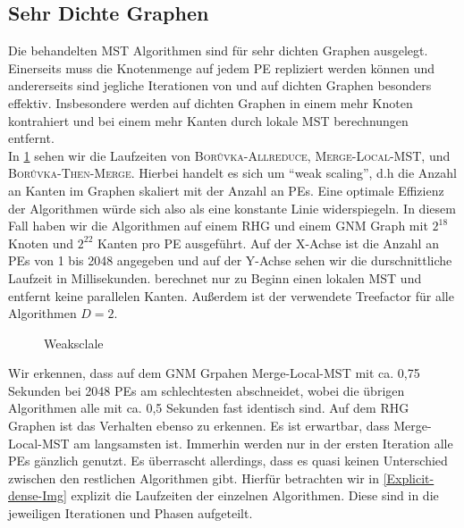 \subsection{Sehr Dichte Graphen}\label{dense}
Die behandelten MST Algorithmen sind für sehr dichten Graphen ausgelegt. Einerseits muss die Knotenmenge auf jedem PE repliziert werden können und andererseits sind jegliche Iterationen von \boruvkaAllreduce und \mergeMST auf dichten Graphen besonders effektiv. Insbesondere werden auf dichten Graphen in einem \boruvkaStep mehr Knoten kontrahiert und bei einem \mergeStep mehr Kanten durch lokale MST berechnungen entfernt.\\
In \cref{WeakSkale-dense-Img} sehen wir die Laufzeiten von \textsc{Bor{\r u}vka-Allreduce}, \textsc{Merge-Local-MST}, \boruvkaMixedMerge und \textsc{Bor{\r u}vka-Then-Merge}. Hierbei handelt es sich um \enquote{weak scaling}, d.h die Anzahl an Kanten im Graphen skaliert mit der Anzahl an PEs. Eine optimale Effizienz der Algorithmen würde sich also als eine konstante Linie widerspiegeln. In diesem Fall haben wir die Algorithmen auf einem RHG und einem GNM Graph mit $2^{18}$ Knoten und $2^{22}$ Kanten pro PE ausgeführt. Auf der X-Achse ist die Anzahl an PEs von 1 bis 2048 angegeben und auf der Y-Achse sehen wir die durschnittliche Laufzeit in Millisekunden. \boruvkaAllreduce berechnet nur zu Beginn einen lokalen MST und entfernt keine parallelen Kanten. Außerdem ist der verwendete Treefactor für alle Algorithmen $D=2$.

\begin{figure}[H]
    \centering
    
    
    \caption{Weaksclale}
    \label{WeakSkale-dense-Img}
\end{figure}

Wir erkennen, dass auf dem GNM Grpahen Merge-Local-MST mit ca. 0,75 Sekunden bei 2048 PEs am schlechtesten abschneidet, wobei die übrigen Algorithmen alle mit ca. 0,5 Sekunden fast identisch sind. Auf dem RHG Graphen ist das Verhalten ebenso zu erkennen.
Es ist erwartbar, dass Merge-Local-MST am langsamsten ist. Immerhin werden nur in der ersten Iteration alle PEs gänzlich genutzt. Es überrascht allerdings, dass es quasi keinen Unterschied zwischen den restlichen Algorithmen gibt. Hierfür betrachten wir in \cref{Explicit-dense-Img} explizit die Laufzeiten der einzelnen Algorithmen. Diese sind in die jeweiligen Iterationen und Phasen aufgeteilt.



